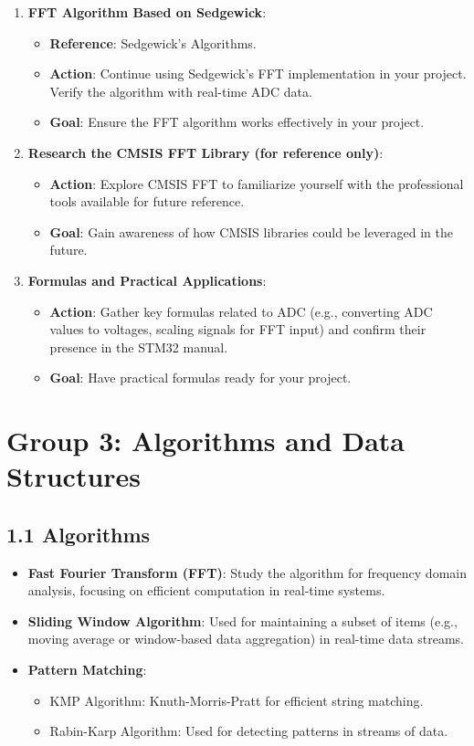 \documentclass{article}
\begin{document}
\begin{enumerate}
    \item \textbf{FFT Algorithm Based on Sedgewick}:
    \begin{itemize}
        \item \textbf{Reference}: Sedgewick’s Algorithms.
        \item \textbf{Action}: Continue using Sedgewick’s FFT implementation in your project. Verify the algorithm with real-time ADC data.
        \item \textbf{Goal}: Ensure the FFT algorithm works effectively in your project.
    \end{itemize}

    \item \textbf{Research the CMSIS FFT Library (for reference only)}:
    \begin{itemize}
        \item \textbf{Action}: Explore CMSIS FFT to familiarize yourself with the professional tools available for future reference.
        \item \textbf{Goal}: Gain awareness of how CMSIS libraries could be leveraged in the future.
    \end{itemize}

    \item \textbf{Formulas and Practical Applications}:
    \begin{itemize}
        \item \textbf{Action}: Gather key formulas related to ADC (e.g., converting ADC values to voltages, scaling signals for FFT input) and confirm their presence in the STM32 manual.
        \item \textbf{Goal}: Have practical formulas ready for your project.
    \end{itemize}
\end{enumerate}

\section*{Group 3: Algorithms and Data Structures}

\subsection*{1.1 Algorithms}
\begin{itemize}
    \item \textbf{Fast Fourier Transform (FFT)}: Study the algorithm for frequency domain analysis, focusing on efficient computation in real-time systems.
    \item \textbf{Sliding Window Algorithm}: Used for maintaining a subset of items (e.g., moving average or window-based data aggregation) in real-time data streams.
    \item \textbf{Pattern Matching}:
    \begin{itemize}
        \item KMP Algorithm: Knuth-Morris-Pratt for efficient string matching.
        \item Rabin-Karp Algorithm: Used for detecting patterns in streams of data.
    \end{itemize}
\end{itemize}
\end{document}
